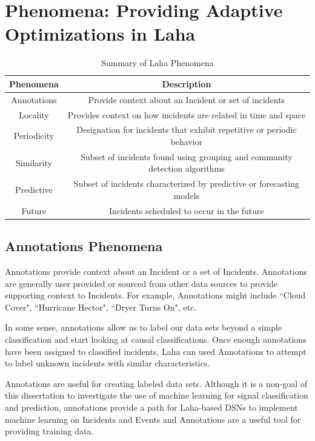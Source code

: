 \section{Phenomena: Providing Adaptive Optimizations in Laha}\label{sec:phenomena}

\begin{table}
	\centering
	\caption{Summary of Laha Phenomena}
	\begin{tabular}{|c|c|}
		\hline
		Phenomena & Description \\
		\hline
		Annotations & Provide context about an Incident or set of incidents \\
		\hline
		Locality & Provides context on how incidents are related in time and space \\
		\hline
		Periodicity & Designation for incidents that exhibit repetitive or periodic behavior \\
		\hline
		Similarity & Subset of incidents found using grouping and community detection algorithms \\
		\hline
		Predictive & Subset of incidents characterized by predictive or forecasting models\\
		\hline
		Future & Incidents scheduled to occur in the future\\
		\hline
	\end{tabular}
	\label{phenomena-summary-table}
\end{table}

\subsection{Annotations Phenomena}\label{subsec:annotations-phenomena}
Annotations provide context about an Incident or a set of Incidents. Annotations are generally user provided or sourced from other data sources to provide supporting context to Incidents. For example, Annotations might include ``Cloud Cover", ``Hurricane Hector", ``Dryer Turns On", etc.

In some sense, annotations allow us to label our data sets beyond a simple classification and start looking at causal classifications. Once enough annotations have been assigned to classified incidents, Laha can used Annotations to attempt to label unknown incidents with similar characteristics.

Annotations are useful for creating labeled data sets. Although it is a non-goal of this dissertation to investigate the use of machine learning for signal classification and prediction, annotations provide a path for Laha-based DSNs to implement machine learning on Incidents and Events and Annotations are a useful tool for providing training data.

